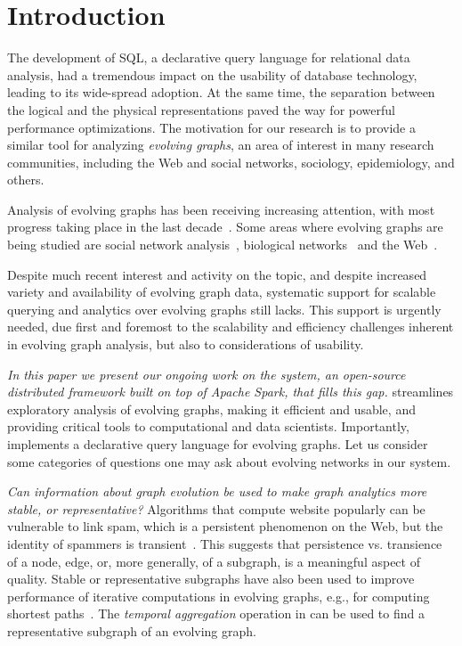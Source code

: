 \section{Introduction}
\label{sec:intro}

The development of SQL, a declarative query language for relational
data analysis, had a tremendous impact on the usability of database
technology, leading to its wide-spread adoption.  At the same time,
the separation between the logical and the physical representations
paved the way for powerful performance optimizations.  The motivation
for our research is to provide a similar tool for analyzing {\em
  evolving graphs}, an area of interest in many research communities,
including the Web and social networks, sociology, epidemiology, and
others.

Analysis of evolving graphs has been receiving increasing attention,
with most progress taking place in the last
decade~\cite{DBLP:journals/csur/AggarwalS14,Chan2008,Kan2009,DBLP:journals/tos/MiaoHLWYZPCC15,Ren2011,Semertzidis2015}.
Some areas where evolving graphs are being studied are social network
analysis~\cite{DBLP:conf/icwsm/GoetzLMF09,DBLP:journals/tweb/LeskovecAH07,DBLP:conf/kdd/LeskovecBKT08,DBLP:conf/icml/SarkarCJ12},
biological
networks~\cite{DBLP:journals/tkdd/AsurPU09,DBLP:journals/tcsb/BeyerTLSF10,Stuart2003}
and the
Web~\cite{DBLP:journals/kais/ChanBL08,DBLP:journals/jisa/PapadimitriouDG10}.

Despite much recent interest and activity on the topic, and despite
increased variety and availability of evolving graph data, systematic
support for scalable querying and analytics over evolving graphs still
lacks. This support is urgently needed, due first and foremost to the
scalability and efficiency challenges inherent in evolving graph
analysis, but also to considerations of usability. 

 {\em In this paper we present our ongoing work on the \ql system, an
   open-source distributed framework built on top of Apache Spark,
   that fills this gap.} \ql streamlines exploratory analysis of
 evolving graphs, making it efficient and usable, and providing
 critical tools to computational and data scientists.  Importantly,
 \ql implements a declarative query language for evolving graphs.  
%
Let us consider some categories of questions one may ask about
evolving networks in our system.

{\em Can information about graph evolution be used to make graph
  analytics more stable, or representative?}  Algorithms that compute
website popularly can be vulnerable to link spam, which is a
persistent phenomenon on the Web, but the identity of spammers is
transient~\cite{DBLP:conf/cikm/YangQZGL07}.  This suggests that
persistence vs. transience of a node, edge, or, more generally, of a
subgraph, is a meaningful aspect of quality.  Stable or representative
subgraphs have also been used to improve performance of iterative
computations in evolving graphs, e.g., for computing shortest
paths~\cite{Ren2011}.  The {\em temporal aggregation} operation in \ql
can be used to find a representative subgraph of an evolving graph.

